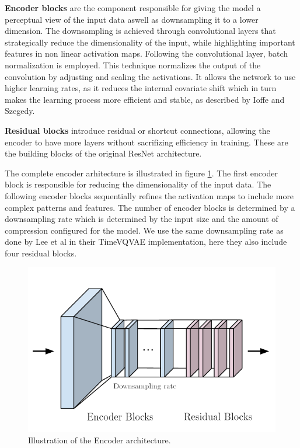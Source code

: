 \textbf{Encoder blocks} are the component responsible for giving the model a perceptual view of the input data aswell as downsampling it to a lower dimension. The downsampling is achieved through convolutional layers that strategically reduce the dimensionality of the input, while highlighting important features in non linear activation maps. 
Following the convolutional layer, batch normalization is employed. This technique normalizes the output of the convolution by adjusting and scaling the activations. It allows the network to use higher learning rates, as it reduces the internal covariate shift which in turn makes the learning process more efficient and stable, as described by Ioffe and Szegedy\cite{batchnorm}.

\textbf{Residual blocks} introduce residual or shortcut connections, allowing the encoder to have more layers without sacrifizing efficiency in training. 
These are the building blocks of the original ResNet architecture.

The complete encoder arhitecture is illustrated in figure \ref{fig:Encoder}. The first encoder block is responsible for reducing the dimensionality of the input data. The following encoder blocks sequentially refines the activation maps to include more complex patterns and features.
The number of encoder blocks is determined by a downsampling rate which is determined by the input size and the amount of compression configured for the model. We use the same downsampling rate as done by Lee et al\cite{lee2023masked} in their TimeVQVAE implementation, here they also include four residual blocks.


\begin{figure}[H]
    \includegraphics[scale=0.8]{figures/figure-pdf/Encoder.pdf}
    \caption{Illustration of the Encoder architecture.}
    \label{fig:Encoder}
\end{figure}

